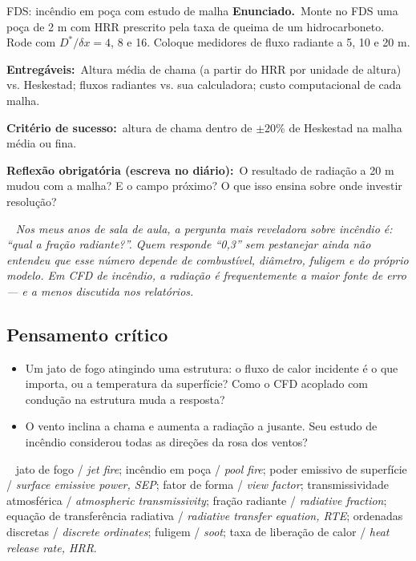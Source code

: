 \documentclass[10pt,a4paper,twocolumn,openany]{report}
\newcommand{\lead}[2]{\par\medskip\noindent{\color{#1}\bfseries #2}\ }
\newenvironment{professor}{\lead{laranja}{Nota do professor.}\itshape}{\par\medskip}
\newenvironment{critico}{\subsection*{\textcolor{roxo}{Pensamento crítico}}}{\par}
\newenvironment{chaves}{\lead{cinza}{Palavras-chave (PT/EN):}\small}{\par}
\newcommand{\enunciado}{\noindent\textbf{Enunciado.}\ }
\newcommand{\entregaveis}{\par\medskip\noindent\textbf{Entregáveis:}}
\newcommand{\criterio}{\par\medskip\noindent\textbf{Critério de sucesso:}\ }
\newcommand{\reflexao}{\par\medskip\noindent\textbf{Reflexão obrigatória (escreva no diário):}}
\begin{document}
\begin{tarefa}{FDS: incêndio em poça com estudo de malha}
\enunciado Monte no FDS uma poça de 2 m com HRR prescrito pela taxa de
queima de um hidrocarboneto. Rode com $D^*/\delta x=4$, 8 e 16. Coloque
medidores de fluxo radiante a 5, 10 e 20 m.
\entregaveis\ Altura média de chama (a partir do HRR por unidade de altura)
vs. Heskestad; fluxos radiantes vs. sua calculadora; custo computacional de
cada malha.
\criterio altura de chama dentro de $\pm20\%$ de Heskestad na malha média ou fina.
\reflexao\ O resultado de radiação a 20 m mudou com a malha? E o campo
próximo? O que isso ensina sobre onde investir resolução?
\end{tarefa}

\begin{professor}
Nos meus anos de sala de aula, a pergunta mais reveladora sobre incêndio é:
``qual a fração radiante?''. Quem responde ``0,3'' sem pestanejar ainda não
entendeu que esse número depende de combustível, diâmetro, fuligem e do
próprio modelo. Em CFD de incêndio, a radiação é frequentemente a maior
fonte de erro --- e a menos discutida nos relatórios.
\end{professor}

\begin{critico}
\begin{itemize}
  \item Um jato de fogo atingindo uma estrutura: o fluxo de calor incidente
        é o que importa, ou a temperatura da superfície? Como o CFD
        acoplado com condução na estrutura muda a resposta?
  \item O vento inclina a chama e aumenta a radiação a jusante. Seu
        estudo de incêndio considerou todas as direções da rosa dos ventos?
\end{itemize}
\end{critico}

\begin{chaves}
jato de fogo / \emph{jet fire}; incêndio em poça / \emph{pool fire};
poder emissivo de superfície / \emph{surface emissive power, SEP}; fator de
forma / \emph{view factor}; transmissividade atmosférica / \emph{atmospheric
transmissivity}; fração radiante / \emph{radiative fraction}; equação de
transferência radiativa / \emph{radiative transfer equation, RTE}; ordenadas
discretas / \emph{discrete ordinates}; fuligem / \emph{soot}; taxa de liberação
de calor / \emph{heat release rate, HRR}.
\end{chaves}
\end{document}
